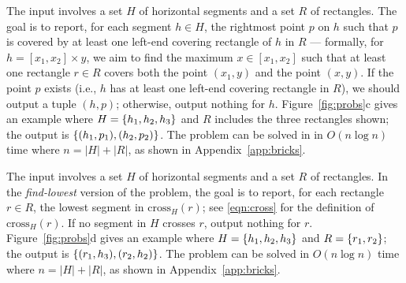 \documentclass[acmsmall,review,anonymous]{acmart}
\def\extraspacing{\vspace{2mm} \noindent}
\def\cross{\mathrm{cross}}
\begin{document}
\extraspacing {\bf Problem $\bm{\mathscr{C}}$.} The input involves a set $H$ of horizontal segments and a set $R$ of rectangles. The goal is to report, for each segment $h \in H$, the rightmost point $p$ on $h$ such that $p$ is covered by at least one left-end covering rectangle of $h$ in $R$ --- formally, for $h = [x_1, x_2] \times y$, we aim to find the maximum $x \in [x_1, x_2]$ such that at least one rectangle $r \in R$ covers both the point $(x_1, y)$ and the point $(x, y)$. If the point $p$ exists (i.e., $h$ has at least one left-end covering rectangle in $R$), we should output a tuple $(h, p)$; otherwise, output nothing for $h$. Figure~\ref{fig:probs}c gives an example where $H = \{h_1, h_2, h_3\}$ and $R$ includes the three rectangles shown; the output is $\{(h_1, p_1), (h_2, p_2)\}$. The problem can be solved in in $O(n \log n)$ time where $n = |H| + |R|$, as shown in Appendix~\ref{app:bricks}.

\extraspacing {\bf Problem $\bm{\mathscr{D}}$.} The input involves a set $H$ of horizontal segments and a set $R$ of rectangles. In the {\em find-lowest} version of the problem, the goal is to report, for each rectangle $r \in R$, the lowest segment in $\cross_H(r)$; see \eqref{eqn:cross} for the definition of $\cross_H(r)$. If no segment in $H$ crosses $r$, output nothing for $r$.  Figure~\ref{fig:probs}d gives an example where $H = \{h_1, h_2, h_3\}$ and $R = \{r_1, r_2\}$; the output is $\{(r_1, h_3), (r_2, h_2)\}$. The problem can be solved in $O(n \log n)$ time where $n = |H| + |R|$, as shown in Appendix~\ref{app:bricks}.
\end{document}
